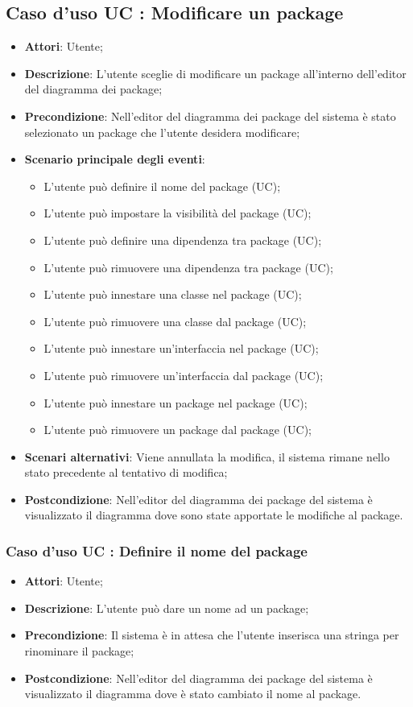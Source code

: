 \documentclass[../AnalisiDeiRequisiti.tex]{subfiles}
\begin{document}
		\subsection{Caso d'uso UC : Modificare un package}
			\begin{itemize}
				\item \textbf{Attori}: Utente;
				\item \textbf{Descrizione}: L'utente sceglie di modificare un package
				all'interno dell'editor del diagramma dei package;
				\item \textbf{Precondizione}: Nell'editor del diagramma dei package del
				sistema è stato selezionato un package che l'utente desidera modificare;
				\item \textbf{Scenario principale degli eventi}:
					\begin{itemize}
						\item L'utente può definire il nome del package (UC);
						\item L'utente può impostare la visibilità del package (UC);
						\item L'utente può definire una dipendenza tra package (UC);
						\item L'utente può rimuovere una dipendenza tra package (UC);
						\item L'utente può innestare una classe nel package (UC);
						\item L'utente può rimuovere una classe dal package (UC);
						\item L'utente può innestare un'interfaccia nel package (UC);
						\item L'utente può rimuovere un'interfaccia dal package (UC);
						\item L'utente può innestare un package nel package (UC);
						\item L'utente può rimuovere un package dal package (UC);
					\end{itemize}
				\item \textbf{Scenari alternativi}: Viene annullata la modifica, il sistema
				rimane nello stato precedente al tentativo di modifica;
				\item \textbf{Postcondizione}: Nell'editor del diagramma dei package del
				sistema è visualizzato il diagramma dove sono state apportate le modifiche
				al package.
			\end{itemize}
		\subsubsection{Caso d'uso UC : Definire il nome del package}
			\begin{itemize}
				\item \textbf{Attori}: Utente;
				\item \textbf{Descrizione}: L'utente può dare un nome ad un package;
				\item \textbf{Precondizione}: Il sistema è in attesa che l'utente inserisca
				una stringa per rinominare il package;
				\item \textbf{Postcondizione}: Nell'editor del diagramma dei package del
				sistema è visualizzato il diagramma dove è stato cambiato il nome
				al package.
			\end{itemize}
\end{document}
